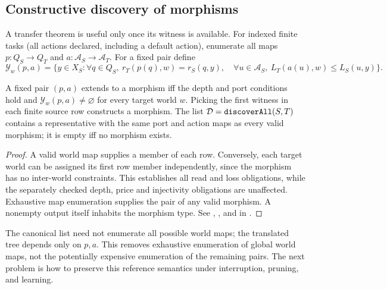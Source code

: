 \subsection{Constructive discovery of morphisms}
A transfer theorem is useful only once its witness is available. For indexed finite tasks (all actions declared, including a default action), enumerate all maps $p:Q_S\to Q_T$ and $a:\mathcal A_S\to\mathcal A_T$. For a fixed pair define
\[
 \mathcal Y_w(p,a)=\{y\in X_S: \forall q\in Q_S,\ r_T(p(q),w)=r_S(q,y),\quad
 \forall u\in\mathcal A_S,\ L_T(a(u),w)\le L_S(u,y)\}.
\]
\begin{theorem}\label{thm:discovery}
A fixed pair $(p,a)$ extends to a morphism iff the depth and port conditions hold and $\mathcal Y_w(p,a)\ne\varnothing$ for every target world $w$. Picking the first witness in each finite source row constructs a morphism. The list $\mathcal D=\texttt{discoverAll}(S,T)$ contains a representative with the same port and action maps as every valid morphism; it is empty iff no morphism exists.
\end{theorem}
\begin{proof}
A valid world map supplies a member of each row. Conversely, each target world can be assigned its first row member independently, since the morphism has no inter-world constraints. This establishes all read and loss obligations, while the separately checked depth, price and injectivity obligations are unaffected. Exhaustive map enumeration supplies the pair of any valid morphism. A nonempty output itself inhabits the morphism type. See , , and  in .
\end{proof}
The canonical list need not enumerate all possible world maps; the translated tree depends only on $p,a$. This removes exhaustive enumeration of global world maps, not the potentially expensive enumeration of the remaining pairs. The next problem is how to preserve this reference semantics under interruption, pruning, and learning.
